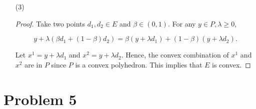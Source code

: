 \documentclass[12pt]{article}
\begin{document}
\begin{enumerate}
\begin{proof}
\end{proof}

\item[(3)]

\begin{proof}

Take two points $d_1, d_2 \in E$ and $\beta \in (0, 1)$. For any $y\in P, \lambda \geqslant 0$, 

$$
y + \lambda(\beta d_1 + (1-\beta)d_2) = \beta(y+\lambda d_1) + (1-\beta)(y + \lambda d_2).
$$

Let $x^1 = y + \lambda d_1$ and $x^2 = y + \lambda d_2$. Hence, the convex combination of $x^1$ and $x^2$ are in $P$ since $P$ is a convex polyhedron. This implies that $E$ is convex.

\end{proof}

\end{enumerate}












\section*{Problem 5}
\end{document}
